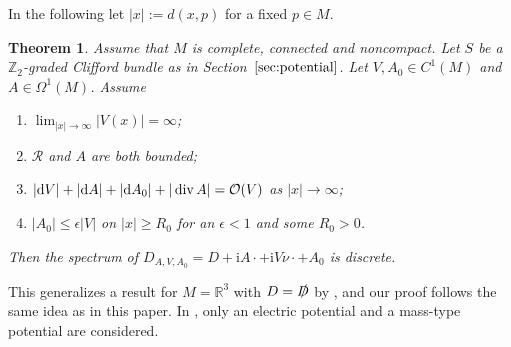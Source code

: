 \documentclass[pdftex]{sigma}
\numberwithin{equation}{section}
\newtheorem{Theorem}{Theorem}[section]
\begin{document}
In the following let $|x|:= d(x,p)$ for a fixed $p\in M$.

\begin{Theorem}\label{thm_pot} Assume that $M$ is complete, connected and noncompact. Let $S$ be a $\mathbb Z_2$-graded Clifford bundle as in Section~$\ref{sec:potential}$. Let $V, A_0\in C^1(M)$ and $A\in \Omega^1(M)$.
Assume
\begin{enumerate}[$(i)$]\itemsep=0pt
		\item $\lim_{|x|\to \infty} |{V}(x)|=\infty$;
		\item $\mathcal{R}$ and $A$ are both bounded;
		\item $|{\rm d}V| + |{\rm d}A| + |{\rm d}A_0|+ |\operatorname{div} A|= \mathcal{O}(V)$ as $|x|\to \infty$;
		\item $|A_0|\leq \epsilon |V|$ on $|x|\geq R_0$ for an $\epsilon <1$ and some $R_0>0$.
\end{enumerate}
Then the spectrum of $D_{A,V, A_0}= D +{\mathrm{i}}A\cdot + {\mathrm{i}}V\nu \cdot +A_0$ is discrete.
\end{Theorem}

This generalizes a result for $M={\mathbb R}^3$ with $D={\slashed{D}}$ by \cite{Yamada}, and our proof follows the same idea as in this paper. In \cite{Yamada}, only an electric potential and a mass-type potential are considered.
\end{document}
